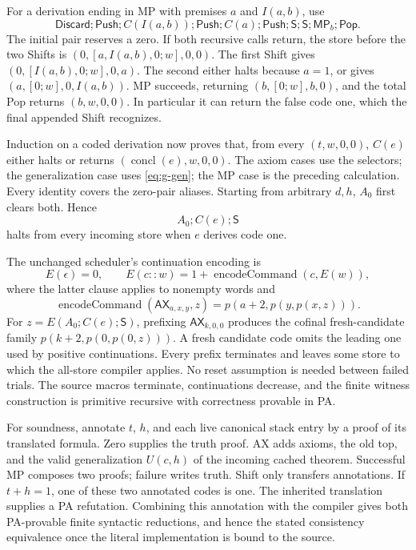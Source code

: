 For a derivation ending in MP with premises $a$ and $I(a,b)$, use
\[
 \mathsf{Discard};\mathsf{Push};C(I(a,b));\mathsf{Push};
 C(a);\mathsf{Push};\mathsf S;\mathsf S;\mathsf{MP}_b;\mathsf{Pop}.
\]
The initial pair reserves a zero. If both recursive calls return, the
store before the two Shifts is
$(0,[a,I(a,b),0;w],0,0)$. The first Shift gives
$(0,[I(a,b),0;w],0,a)$. The second either halts because $a=1$, or gives
$(a,[0;w],0,I(a,b))$. MP succeeds, returning $(b,[0;w],b,0)$, and the
total Pop returns $(b,w,0,0)$. In particular it can return the false code
one, which the final appended Shift recognizes.

Induction on a coded derivation now proves that, from every $(t,w,0,0)$,
$C(e)$ either halts or returns $(\operatorname{concl}(e),w,0,0)$.
The axiom cases use the selectors; the generalization case uses
\eqref{eq:g-gen}; the MP case is the preceding calculation. Every
identity covers the zero-pair aliases. Starting from arbitrary $d,h$,
$A_0$ first clears both. Hence
\[
                         A_0;C(e);\mathsf S
\]
halts from every incoming store when $e$ derives code one.

The unchanged scheduler's continuation encoding is
\[
 E(\epsilon)=0,\qquad
 E(c::w)=1+\operatorname{encodeCommand}(c,E(w)),
\]
where the latter clause applies to nonempty words and
\[
 \operatorname{encodeCommand}(\mathsf{AX}_{a,x,y},z)
       =p(a+2,p(y,p(x,z))).
\]
For $z=E(A_0;C(e);\mathsf S)$, prefixing $\mathsf{AX}_{k,0,0}$ produces
the cofinal fresh-candidate family $p(k+2,p(0,p(0,z)))$. A fresh
candidate code omits the leading one used by positive continuations. Every prefix
terminates and leaves some store to which the all-store compiler applies.
No reset assumption is needed between failed trials. The source macros
terminate, continuations decrease, and the finite witness construction is
primitive recursive with correctness provable in PA.

For soundness, annotate $t$, $h$, and each live canonical stack entry by
a proof of its translated formula. Zero supplies the truth proof. AX adds
axioms, the old top, and the valid generalization $U(c,h)$ of the incoming
cached theorem. Successful MP composes two proofs; failure writes truth.
Shift only transfers annotations. If $t+h=1$, one of these two annotated
codes is one. The inherited translation supplies a PA refutation.
Combining this annotation with the compiler gives both PA-provable finite
syntactic reductions, and hence the stated consistency equivalence once
the literal implementation is bound to the source.

